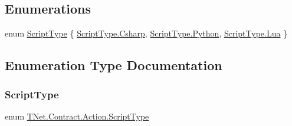 \subsection*{Enumerations}
\begin{DoxyCompactItemize}
\item 
enum \mbox{\hyperlink{namespace_t_net_1_1_contract_1_1_action_a490a546f8f01a9b9305b8a0f8b98eded}{Script\+Type}} \{ \mbox{\hyperlink{namespace_t_net_1_1_contract_1_1_action_a490a546f8f01a9b9305b8a0f8b98ededa6af4c1b916b175ca43898bb34a700d50}{Script\+Type.\+Csharp}}, 
\mbox{\hyperlink{namespace_t_net_1_1_contract_1_1_action_a490a546f8f01a9b9305b8a0f8b98ededaa7f5f35426b927411fc9231b56382173}{Script\+Type.\+Python}}, 
\mbox{\hyperlink{namespace_t_net_1_1_contract_1_1_action_a490a546f8f01a9b9305b8a0f8b98ededa0ae9478a1db9d1e2c48efa49eac1c7c6}{Script\+Type.\+Lua}}
 \}
\end{DoxyCompactItemize}


\subsection{Enumeration Type Documentation}
\mbox{\label{namespace_t_net_1_1_contract_1_1_action_a490a546f8f01a9b9305b8a0f8b98eded}} 
\subsubsection{\texorpdfstring{Script\+Type}{ScriptType}}
{\footnotesize\ttfamily enum \mbox{\hyperlink{namespace_t_net_1_1_contract_1_1_action_a490a546f8f01a9b9305b8a0f8b98eded}{T\+Net.\+Contract.\+Action.\+Script\+Type}}\hspace{0.3cm}{\ttfamily [strong]}}





